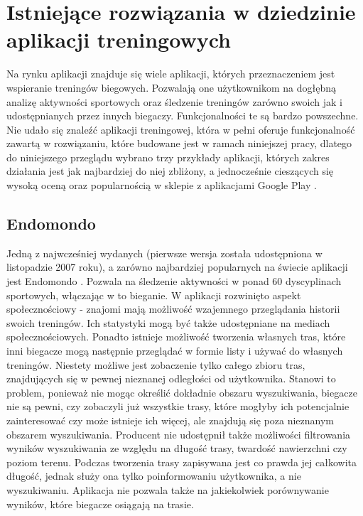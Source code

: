 \section{Istniejące rozwiązania w dziedzinie aplikacji treningowych}\label{chap:istniejace}
Na rynku aplikacji znajduje się wiele aplikacji, których przeznaczeniem jest wspieranie treningów biegowych. Pozwalają one użytkownikom na dogłębną analizę aktywności sportowych oraz śledzenie treningów zarówno swoich jak i udostępnianych przez innych biegaczy. Funkcjonalności te są bardzo powszechne. Nie udało się znaleźć aplikacji treningowej, która w pełni oferuje funkcjonalność zawartą w rozwiązaniu, które budowane jest w ramach niniejszej pracy, dlatego do niniejszego przeglądu wybrano trzy przykłady aplikacji, których zakres działania jest jak najbardziej do niej zbliżony, a jednocześnie cieszących się wysoką oceną oraz popularnością w sklepie z aplikacjami Google Play \cite{googleplay}. 
\subsection{Endomondo}
Jedną z najwcześniej wydanych (pierwsze wersja została udostępniona w listopadzie 2007 roku), a zarówno najbardziej popularnych na świecie aplikacji jest Endomondo \cite{endomondo}.  Pozwala na śledzenie aktywności w ponad 60 dyscyplinach sportowych, włączając w to bieganie. W aplikacji rozwinięto aspekt społecznościowy - znajomi mają możliwość wzajemnego przeglądania historii swoich treningów. Ich statystyki mogą być także udostępniane na mediach społecznościowych. Ponadto istnieje możliwość tworzenia własnych tras, które inni biegacze mogą następnie przeglądać w formie listy i używać do własnych treningów. Niestety możliwe jest zobaczenie tylko całego zbioru tras, znajdujących się w pewnej nieznanej odległości od użytkownika. Stanowi to problem, ponieważ nie mogąc określić dokładnie obszaru wyszukiwania, biegacze nie są pewni, czy zobaczyli już wszystkie trasy, które mogłyby ich potencjalnie zainteresować czy może istnieje ich więcej, ale znajdują się poza nieznanym obszarem wyszukiwania. Producent nie udostępnił także możliwości filtrowania wyników wyszukiwania ze względu na długość trasy, twardość nawierzchni czy poziom terenu. Podczas tworzenia trasy zapisywana jest co prawda jej całkowita długość, jednak służy ona tylko poinformowaniu użytkownika, a nie wyszukiwaniu. Aplikacja nie pozwala także na jakiekolwiek porównywanie wyników, które biegacze osiągają na trasie.
